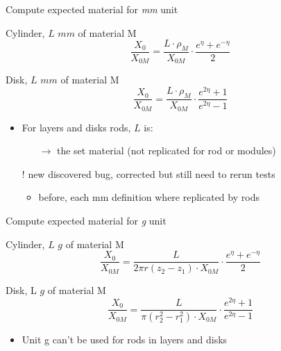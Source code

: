 \documentclass[pdftex, 11pt]{beamer}
\begin{document}
\begin{frame}{Compute expected material for \emph{mm} unit}
  \begin{block}{Cylinder, \alert{$L$} $mm$ of material \alert{M}}
    $$
    \frac{X_0}{X_{0M}} = \frac{L\cdot\rho_M}{X_{0M}}\cdot\frac{e^\eta+e^{-\eta}}{2}
    $$
  \end{block}
  \begin{block}{Disk, \alert{$L$} $mm$ of material \alert{M}}
    $$
    \frac{X_0}{X_{0M}} = \frac{L\cdot\rho_M}{X_{0M}}\cdot\frac{e^{2\eta}+1}{e^{2\eta}-1}
    $$
  \end{block}

  \begin{itemize}
  \item For \alert{layers} and \alert{disks} rods, \alert{$L$} is:
    \begin{itemize}
    \item[$\to$] the set material (not replicated for rod or modules)
    \end{itemize}
  \item[!] \alert{new discovered bug, corrected but still need to rerun tests}
    \begin{itemize}
    \item before, each mm definition where replicated by rods
    \end{itemize}
  \end{itemize}
\end{frame}

\begin{frame}{Compute expected material for \emph{g} unit}
  \begin{block}{Cylinder, \alert{$L$} $g$ of material \alert{M}}
    $$
    \frac{X_0}{X_{0M}} = \frac{L}{2\pi r (z_2-z_1) \cdot X_{0M}} \cdot \frac{e^\eta+e^{-\eta}}{2}
    $$
  \end{block}
  \begin{block}{Disk, \alert{L} $g$ of material \alert{M}}
    $$
    \frac{X_0}{X_{0M}} = \frac{L}{\pi(r_2^2-r_1^2)\cdot X_{0M}}\cdot\frac{e^{2\eta}+1}{e^{2\eta}-1}
    $$
  \end{block}
  \begin{itemize}
  \item Unit \alert{g} can't be used for rods in layers and disks
  \end{itemize}
\end{frame}
\end{document}

